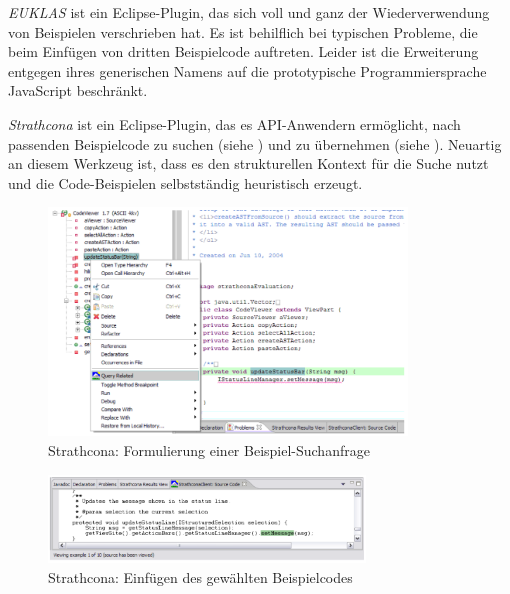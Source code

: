 \textit{EUKLAS} \citep[\textbf{E}clipse \textbf{U}sers’ \textbf{K}eystrokes \textbf{L}essened by \textbf{A}ttaching from \textbf{S}amples;][]{Doerner:2014cm} ist ein Eclipse-Plugin, das sich voll und ganz der Wiederverwendung von Beispielen verschrieben hat. Es ist behilflich bei typischen Probleme, die beim Einfügen von dritten Beispielcode auftreten. Leider ist die Erweiterung entgegen ihres generischen Namens auf die prototypische Programmiersprache JavaScript beschränkt.


\textit{Strathcona} \citep{Holmes:2005cm} ist ein Eclipse-Plugin, das es API-Anwendern ermöglicht, nach passenden Beispielcode zu suchen (siehe ) und zu übernehmen (siehe ). Neuartig an diesem Werkzeug ist, dass es den strukturellen Kontext für die Suche nutzt und die Code-Beispielen selbstständig heuristisch erzeugt.

\begin{figure}[!ht]
  \centering
    \includegraphics[width=0.85\textwidth]{Figures/tools/strathcona1.png}
  \caption{Strathcona: Formulierung einer Beispiel-Suchanfrage \citep{Holmes:2005cm}}
  \label{fig:strathcona1}
\end{figure}

\begin{figure}[!ht]
  \centering
    \includegraphics[width=0.75\textwidth]{Figures/tools/strathcona2.png}
  \caption{Strathcona: Einfügen des gewählten Beispielcodes \citep{Holmes:2005cm}}
  \label{fig:strathcona2}
\end{figure}


